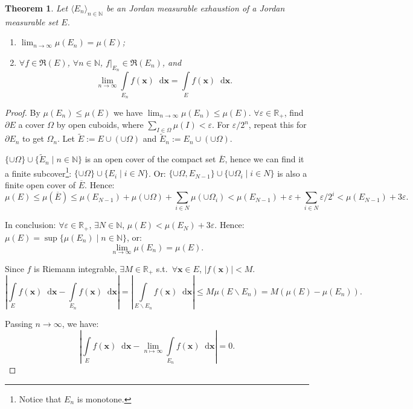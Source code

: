 \documentclass[openany]{book}
\theoremstyle{plain}
\newtheorem{theorem}{Theorem}[section] %
\theoremstyle{definition}
\newcommand{\dif}{\mathop{}\!\mathrm{d}} %
\newcommand*{\bv}{\boldsymbol} %
\begin{document}
\begin{theorem}
	\label{theorem: measure of limit of sets}
	Let $\langle E_n \rangle_{n \in \mathbb N}$ be an Jordan measurable exhaustion of a Jordan measurable set $E$.
	\begin{enumerate}
		\item $\lim_{n \to \infty} \mu(E_n) = \mu(E)$;
		\item $\forall f \in \mathfrak R(E)$, $\forall n \in \mathbb N$, $f|_{E_n} \in \mathfrak R(E_n)$, and
		\begin{equation*}
			\lim_{n \to \infty} \int\limits_{E_n} f(\bv x) \dif \bv x = \int\limits_E f(\bv x) \dif \bv x.
		\end{equation*}
	\end{enumerate}
\end{theorem}
\begin{proof}
	By $\mu(E_n) \leq \mu(E)$ we have $\lim_{n \to \infty} \mu(E_n) \leq \mu(E)$.
	$\forall \varepsilon \in \mathbb R_+$, find $\partial E$ a cover $\varOmega$ by open cuboids, where $\sum_{I \in \varOmega} \mu(I) < \varepsilon$. 
	For $\varepsilon / 2^n$, repeat this for $\partial E_n$ to get $\varOmega_n$.
	Let $\tilde E := E \cup (\cup \varOmega)$ and $\tilde E_n := E_n \cup (\cup \varOmega)$.

	$\{\cup \varOmega\} \cup \{\tilde E_n \mid n \in \mathbb N\}$ is an open cover of the compact set $\overline E$, hence we can find it a finite subcover\footnote{Notice that $E_n$ is monotone.}: $\{\cup \varOmega\} \cup \{E_{i} \mid i \in N\}$. 
	Or: $\{\cup \varOmega, E_{N-1}\} \cup \{\cup \varOmega_i \mid i \in N\}$ is also a finite open cover of $\overline E$. 
	Hence:
	\begin{equation*}
		\mu(E) \leq \mu(\overline E) 
		\leq \mu(E_{N-1}) + \mu(\cup \varOmega) + \sum_{i \in N} \mu(\cup \varOmega_i)
		< \mu(E_{N-1}) + \varepsilon + \sum_{i \in N} \varepsilon/2^i 
		< \mu(E_{N-1}) + 3\varepsilon.
	\end{equation*}

	In conclusion: $\forall \varepsilon \in \mathbb R_+$, $\exists N \in \mathbb N$, $\mu(E) < \mu(E_N) + 3 \varepsilon$. Hence: $\mu(E) = \sup \{\mu(E_n) \mid n \in \mathbb N\}$, or:
	\begin{equation*}
		\lim_{n \to \infty} \mu(E_n) = \mu(E).
	\end{equation*}

	Since $f$ is Riemann integrable, $\exists M \in \mathbb R_+$ s.t.\ $\forall \bv x \in E$, $|f(\bv x)| < M$.
	\begin{equation*}
		\left|
			\int\limits_E f(\bv x) \dif \bv x - \int\limits_{E_n} f(\bv x) \dif \bv x
		\right| 
		= \left|
			\int\limits_{E \backslash E_n} f(\bv x) \dif \bv x 
		\right|
		\leq M \mu(E \backslash E_n) = M (\mu(E) - \mu(E_n)).
	\end{equation*}

	Passing $n \to \infty$, we have: 
	\begin{equation*}
		\left|
			\int\limits_E f(\bv x) \dif \bv x - \lim_{n \mapsto \infty}\int\limits_{E_n} f(\bv x) \dif \bv x
		\right| = 0.
	\end{equation*}
\end{proof}
\end{document}
